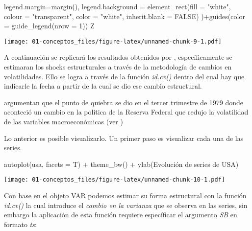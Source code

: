 \documentclass[
]{book}
\newenvironment{Shaded}{\begin{snugshade}}{\end{snugshade}}
\newcommand{\AttributeTok}[1]{\textcolor[rgb]{0.77,0.63,0.00}{#1}}
\newcommand{\ConstantTok}[1]{\textcolor[rgb]{0.00,0.00,0.00}{#1}}
\newcommand{\DecValTok}[1]{\textcolor[rgb]{0.00,0.00,0.81}{#1}}
\newcommand{\FunctionTok}[1]{\textcolor[rgb]{0.00,0.00,0.00}{#1}}
\newcommand{\NormalTok}[1]{#1}
\newcommand{\SpecialCharTok}[1]{\textcolor[rgb]{0.00,0.00,0.00}{#1}}
\newcommand{\StringTok}[1]{\textcolor[rgb]{0.31,0.60,0.02}{#1}}
\begin{document}
\begin{Shaded}
\begin{Highlighting}[]
  \AttributeTok{legend.margin=}\FunctionTok{margin}\NormalTok{(),}
  \AttributeTok{legend.background =} \FunctionTok{element\_rect}\NormalTok{(}\AttributeTok{fill =} \StringTok{"white"}\NormalTok{, }\AttributeTok{colour =} \StringTok{"transparent"}\NormalTok{,}
                                   \AttributeTok{color =} \StringTok{"white"}\NormalTok{, }\AttributeTok{inherit.blank =} \ConstantTok{FALSE}\NormalTok{)}
\NormalTok{)}\SpecialCharTok{+}\FunctionTok{guides}\NormalTok{(}\AttributeTok{color =} \FunctionTok{guide\_legend}\NormalTok{(}\AttributeTok{nrow =} \DecValTok{1}\NormalTok{))}
\NormalTok{Z}
\end{Highlighting}
\end{Shaded}

\texttt{[image: 01-conceptos\_files/figure-latex/unnamed-chunk-9-1.pdf]}

A continuación se replicará los resultados obtenidos por \citet{Herwartz2016}, específicamente se estimaran los shocks estructurales a través de la metodología de cambios en volatilidades. Ello se logra a través de la función \emph{id.cv()} dentro del cual hay que indicarle la fecha a partir de la cual se dio ese cambio estructural.

\citet{Herwartz2016} argumentan que el punto de quiebra se dio en el tercer trimestre de 1979 donde aconteció un cambio en la política de la Reserva Federal que redujo la volatilidad de las variables macroeconómicas (ver \citet{Stock2003})

Lo anterior es posible visualizarlo.
Un primer paso es visualizar cada una de las series.

\begin{Shaded}
\begin{Highlighting}[]
\FunctionTok{autoplot}\NormalTok{(usa, }\AttributeTok{facets =}\NormalTok{ T) }\SpecialCharTok{+} \FunctionTok{theme\_bw}\NormalTok{() }\SpecialCharTok{+} \FunctionTok{ylab}\NormalTok{(}\StringTok{\textquotesingle{}Evolución de series de USA\textquotesingle{}}\NormalTok{)}
\end{Highlighting}
\end{Shaded}

\texttt{[image: 01-conceptos\_files/figure-latex/unnamed-chunk-10-1.pdf]}

Con base en el objeto VAR podemos estimar su forma estructural con la función \emph{id.cv()} la cual introduce el \emph{cambio en la varianza} que se observa en las series, sin embargo la aplicación de esta función requiere específicar el argumento \emph{SB} en formato \emph{ts}:
\end{document}
